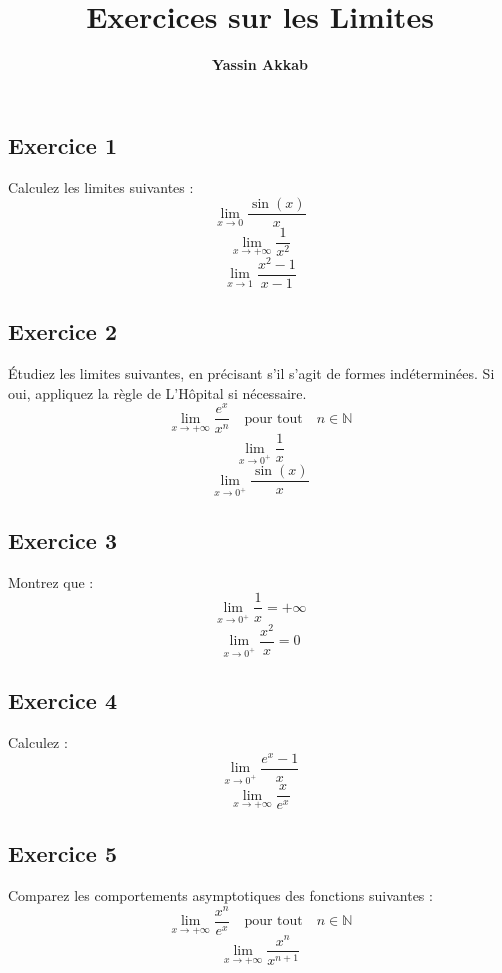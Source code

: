 \documentclass{article}
\title{\textbf{Exercices sur les Limites}}
\author{\textbf{Yassin Akkab}}
\begin{document}
	
	\maketitle
	
	

	
	
	\subsection*{Exercice 1}
	Calculez les limites suivantes :
	\[
	\lim_{x \to 0} \frac{\sin(x)}{x}
	\]
	\[
	\lim_{x \to +\infty} \frac{1}{x^2}
	\]
	\[
	\lim_{x \to 1} \frac{x^2 - 1}{x - 1}
	\]
	
	\subsection*{Exercice 2}
	Étudiez les limites suivantes, en précisant s'il s'agit de formes indéterminées. Si oui, appliquez la règle de L'Hôpital si nécessaire.
	\[
	\lim_{x \to +\infty} \frac{e^x}{x^n} \quad \text{pour tout} \quad n \in \mathbb{N}
	\]
	\[
	\lim_{x \to 0^+} \frac{1}{x}
	\]
	\[
	\lim_{x \to 0^+} \frac{\sin(x)}{x}
	\]
	
	\subsection*{Exercice 3}
	Montrez que :
	\[
	\lim_{x \to 0^+} \frac{1}{x} = +\infty
	\]
	\[
	\lim_{x \to 0^+} \frac{x^2}{x} = 0
	\]
	
	\subsection*{Exercice 4}
	Calculez :
	\[
	\lim_{x \to 0^+} \frac{e^x - 1}{x}
	\]
	\[
	\lim_{x \to +\infty} \frac{x}{e^x}
	\]
	
	\subsection*{Exercice 5}
	Comparez les comportements asymptotiques des fonctions suivantes :
	\[
	\lim_{x \to +\infty} \frac{x^n}{e^x} \quad \text{pour tout} \quad n \in \mathbb{N}
	\]
	\[
	\lim_{x \to +\infty} \frac{x^n}{x^{n+1}}
	\]
	
		
		
	
	
	
	
	
	
	
\end{document}

